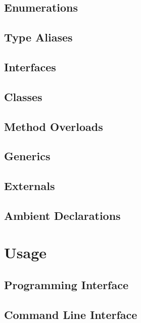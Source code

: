 \subsection{Enumerations}

\subsection{Type Aliases}

\subsection{Interfaces}

\subsection{Classes}

\subsection{Method Overloads}

\subsection{Generics}

\subsection{Externals}

\subsection{Ambient Declarations}

\section{Usage}
\label{sec:usage}

\subsection{Programming Interface}
\label{sec:usage-api}

\subsection{Command Line Interface}
\label{sec:usage-cli}
